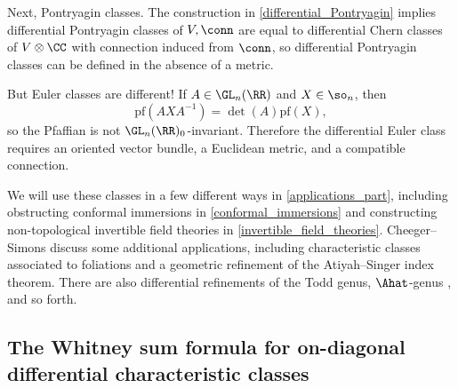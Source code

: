\begin{remark}
	Next, Pontryagin classes. The construction in \cref{differential_Pontryagin} implies differential Pontryagin
	classes of $V,  \conn$ are equal to differential Chern classes of $V\otimes\CC$ with connection induced from
	$\conn$, so differential Pontryagin classes can be defined in the absence of a metric.

	But Euler classes are different! If $A\in\GL_n( \RR)$ and $X\in\so_n$, then
	\begin{equation}
		\mathrm{pf}(AXA^{-1}) = \det(A)\mathrm{pf}(X)\comma
	\end{equation}
	so the Pfaffian is not $\GL_n( \RR)_0$-invariant. Therefore the differential Euler class requires an oriented
	vector bundle, a Euclidean metric, and a compatible connection.
\end{remark}

We will use these classes in a few different ways in \cref{applications_part}, including obstructing conformal
immersions in \cref{conformal_immersions} and constructing non-topological invertible field theories in
\cref{invertible_field_theories}. Cheeger--Simons \cite{Cheeger-Simons} discuss some additional applications,
including characteristic classes associated to foliations and a geometric refinement of the Atiyah--Singer index
theorem. There are also differential refinements of the Todd genus, $\Ahat$-genus \cite[Definition
3.9]{GS21}, and so forth.


\subsection{The Whitney sum formula for on-diagonal differential characteristic classes}

